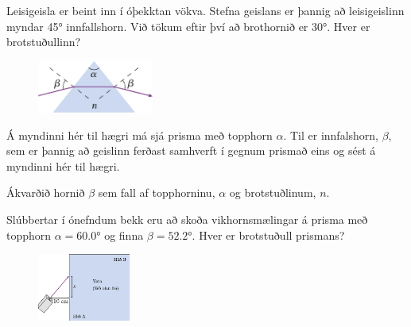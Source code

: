 \begin{enumerate}[label = \textbf{(\alph*)}]

\item[\textbf{(34.10)}] Leisigeisla er beint inn í óþekktan vökva. Stefna geislans er þannig að leisigeislinn myndar \ang{45} innfallshorn. Við tökum eftir því að brothornið er \ang{30}. Hver er brotstuðullinn?

\vspace{0.5cm}

\begin{minipage}{\linewidth}
\begin{figure}
\vspace{-0.5cm}
\includegraphics[width = 1.5in]{figures/vikhorn.pdf}
\end{figure}

\item[\textbf{(34.58)}] Á myndinni hér til hægri má sjá prisma með topphorn $\alpha$. Til er innfalshorn, $\beta$, sem er þannig að geislinn ferðast samhverft í gegnum prismað eins og sést á myndinni hér til hægri. \begin{enumerate*}[label = \textbf{(\alph*)}]
    \item Ákvarðið hornið $\beta$ sem fall af topphorninu, $\alpha$ og brotstuðlinum, $n$.
    \item Slúbbertar í ónefndum bekk eru að skoða vikhornsmælingar á prisma með topphorn $\alpha = \ang{60.0}$ og finna $\beta = \ang{52.2}$. Hver er brotstuðull prismans?
\end{enumerate*}

\vspace{0.5cm}

\begin{minipage}{\linewidth}
\begin{figure}
\vspace{-0.5cm}
\includegraphics[width = 1.2in]{figures/rk3354.pdf}
\end{figure}


\end{minipage}
\end{minipage}
\end{enumerate}
